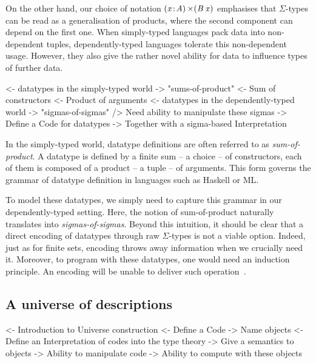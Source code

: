 On the other hand, our choice of notation $\SIGMA{\V{x}}{\V{A}} (\V{B}\:\V{x})$
emphasises that $\Sigma$-types can be read as a generalisation of products,
where the second component can depend on the first one. When simply-typed
languages pack data into non-dependent tuples, dependently-typed languages
tolerate this non-dependent usage. However, they also give the rather novel
ability for data to influence types of further data.

\begin{wstructure}
<- datatypes in the simply-typed world
    -> "sums-of-product"
        <- Sum of constructors
        <- Product of arguments
<- datatypes in the dependently-typed world
    -> "sigmas-of-sigmas"
    /> Need ability to manipulate these sigmas
        -> Define a Code for datatypes
        -> Together with a sigma-based Interpretation
\end{wstructure}

In the simply-typed world, datatype definitions are often referred to
as \emph{sum-of-product}. A datatype is defined by a finite sum -- a
choice -- of constructors, each of them is composed of a product -- a
tuple -- of arguments. This form governs the grammar of datatype
definition in languages such as Haskell or ML.

To model these datatypes, we simply need to capture this grammar in
our dependently-typed setting. Here, the notion of sum-of-product
naturally translates into \emph{sigmas-of-sigmas}. Beyond this
intuition, it should be clear that a direct encoding of datatypes
through raw $\Sigma$-types is not a viable option. Indeed, just as for
finite sets, encoding throws away information when we crucially need
it. Moreover, to program with these datatypes, one would need an
induction principle. An encoding will be unable to deliver such
operation~\cite{geuvers:induction-not-derivable}.


\subsection{A universe of descriptions}
\label{sec:desc-universe}

\begin{wstructure}
<- Introduction to Universe construction
    <- Define a Code
        -> Name objects
    <- Define an Interpretation of codes into the type theory
        -> Give a semantics to objects
    -> Ability to manipulate code
    -> Ability to compute with these objects
\end{wstructure}

